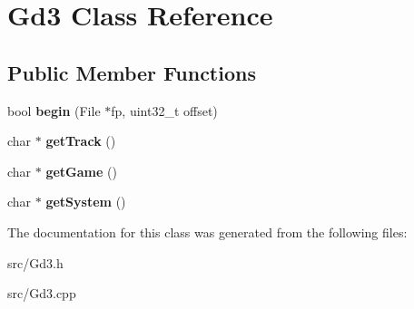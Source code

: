 \hypertarget{classGd3}{}\section{Gd3 Class Reference}
\label{classGd3}
\subsection*{Public Member Functions}
\begin{DoxyCompactItemize}
\item 
\mbox{\label{classGd3_ad9b4c99452da6743ad631a0dd0d92931}} 
bool {\bfseries begin} (File $\ast$fp, uint32\+\_\+t offset)
\item 
\mbox{\label{classGd3_a9725a659ebedbe3aeb5ee6a8223ef436}} 
char $\ast$ {\bfseries get\+Track} ()
\item 
\mbox{\label{classGd3_af890115f45610e9bd4811e5e10fe9545}} 
char $\ast$ {\bfseries get\+Game} ()
\item 
\mbox{\label{classGd3_a830ec44ebaeeb04d2280e596ffeb361f}} 
char $\ast$ {\bfseries get\+System} ()
\end{DoxyCompactItemize}


The documentation for this class was generated from the following files\+:\begin{DoxyCompactItemize}
\item 
src/Gd3.\+h\item 
src/Gd3.\+cpp\end{DoxyCompactItemize}
